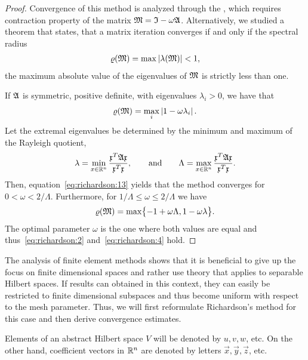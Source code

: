 \begin{proof}
  Convergence of this method is analyzed through the , which requires contraction
  property of the matrix $\mathfrak{M} = \mathfrak{I} - \omega \mathfrak{A}$.
  Alternatively, we studied a theorem that
  states, that a matrix iteration converges if and only if the
  spectral radius
  \begin{gather*}
    \varrho(\mathfrak{M}) = \max \left|\lambda(\mathfrak{M})\right| < 1,
  \end{gather*}
  the maximum absolute value of the eigenvalues of $\mathfrak{M}$ is
  strictly less than one.
  
  If $\mathfrak{A}$ is symmetric, positive definite, with eigenvalues
  $\lambda_i > 0$, we have that
  \begin{gather}
    \label{eq:richardson:13}
    \varrho(\mathfrak{M}) = \max_i \left|1-\omega \lambda_i\right|.
  \end{gather}
  Let the extremal eigenvalues be determined by the minimum and
  maximum of the Rayleigh quotient,
  \begin{gather}
    \label{eq:richardson:3}
    \lambda
    = \min_{x\in \mathbb R^n} \frac{\mathfrak{x}^T\mathfrak{A}\mathfrak{x}}{\mathfrak{x}^T\mathfrak{x}},
    \qquad\text{and}\qquad
    \Lambda = \max_{x\in \mathbb R^n} \frac{\mathfrak{x}^T\mathfrak{A}\mathfrak{x}}{\mathfrak{x}^T\mathfrak{x}}.
  \end{gather}
  Then, equation~\eqref{eq:richardson:13} yields that the method
  converges for $0 < \omega < 2/\Lambda$. Furthermore, for 
  $1/\Lambda \le \omega \le 2/\Lambda$ we have
  \begin{gather*}
    \varrho(\mathfrak{M}) = \max \bigl\{ -1+\omega \Lambda,  1-\omega \lambda \bigr\}.
  \end{gather*}
  The optimal parameter $\omega$ is the one where both values are
  equal and thus~\eqref{eq:richardson:2} and~\eqref{eq:richardson:4} hold.
\end{proof}

\begin{intro}
  The analysis of finite element methods shows that it is beneficial
  to give up the focus on finite dimensional spaces and rather use
  theory that applies to separable Hilbert spaces. If results can
  obtained in this context, they can easily be restricted to finite
  dimensional subspaces and thus become uniform with respect to the
  mesh parameter. Thus, we will first reformulate Richardson's method
  for this case and then derive convergence estimates.
\end{intro}

\begin{intro}
  Elements of an abstract Hilbert space $V$ will be denoted by
  $u,v,w$, etc. On the other hand, coefficient vectors in $\mathbb R^n$ are
  denoted by letters $\vec x,\vec y,\vec z$, etc.
\end{intro}


